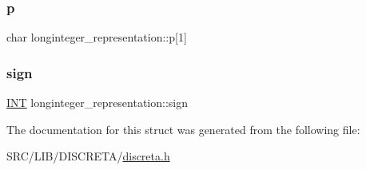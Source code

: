 \subsubsection{\texorpdfstring{p}{p}}
{\footnotesize\ttfamily char longinteger\+\_\+representation\+::p\mbox{[}1\mbox{]}}

\mbox{\label{structlonginteger__representation_a7433f35e6857a586dddd665f225ca5fc}} 
\subsubsection{\texorpdfstring{sign}{sign}}
{\footnotesize\ttfamily \mbox{\hyperlink{galois_8h_a09fddde158a3a20bd2dcadb609de11dc}{I\+NT}} longinteger\+\_\+representation\+::sign}



The documentation for this struct was generated from the following file\+:\begin{DoxyCompactItemize}
\item 
S\+R\+C/\+L\+I\+B/\+D\+I\+S\+C\+R\+E\+T\+A/\mbox{\hyperlink{discreta_8h}{discreta.\+h}}\end{DoxyCompactItemize}
